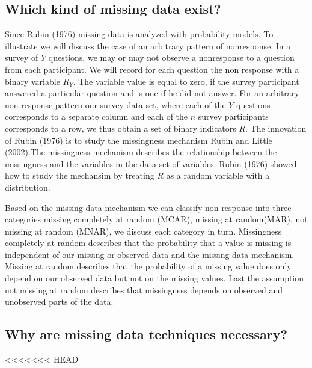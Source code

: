 \subsection{Which kind of missing data exist?} 
Since Rubin (1976) missing data is analyzed with probability models. 
To illustrate we will discuss the case of an arbitrary pattern of nonresponse.
In a survey of $Y$ questions, we may or may not observe a nonresponse to a question from each participant. 
We will record for each question the non response with a binary variable $R_Y$. 
The variable value is equal to zero, if the survey participant answered a particular question and is one if he did not answer. 
For an arbitrary non response pattern our survey data set, where each of the $Y$ questions corresponds to a separate column and each of the $n$ survey participants corresponds to a row, we thus obtain a set of binary indicators $R$.
The innovation of Rubin (1976) is to study the missingness mechanism Rubin and Little (2002).The missingness mechanism describes the relationship between the missingness and the variables in the data set of variables. Rubin (1976) showed how to study the mechansim by treating $R$ as a random variable with a distribution. \par
Based on the missing data mechanism we can classify non response into three categories missing completely at random (MCAR), missing at random(MAR), not missing at random (MNAR), we discuss each category in turn.  Missingness completely at random describes that the probability that a value is missing is independent of our missing or observed data and the missing data mechanism. 
Missing at random describes that the probability of a missing value does only depend on our observed data but not on the missing values. 
Last the assumption not missing at random describes that missingness depends on observed and unobserved parts of the data. \par

\subsection{Why are missing data techniques necessary?}
<<<<<<< HEAD

